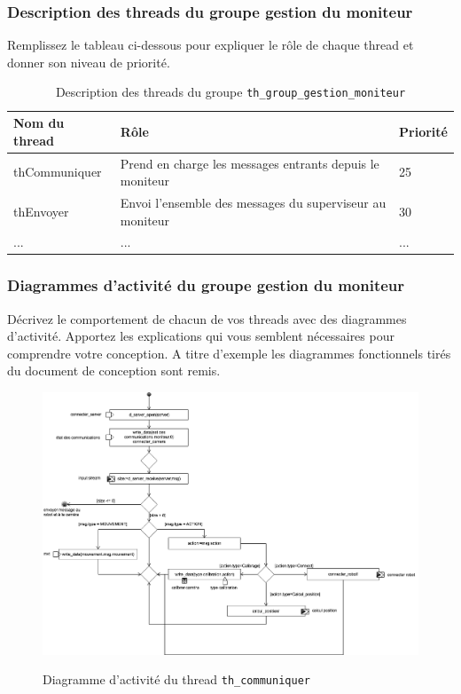 \documentclass[11pt, a4paper]{paper}
\begin{document}
\subsubsection{Description des threads  du groupe gestion du moniteur}
{\color{red} Remplissez le tableau ci-dessous pour expliquer le rôle de chaque thread et donner son niveau de priorité.}


\begin{table}[htp]
\caption{Description des threads du groupe {\tt th\_group\_gestion\_moniteur}}
\begin{center}
\begin{tabular}{|p{3cm}|p{8.5cm}|p{2cm}|}
\hline
\bf Nom du thread &	\bf Rôle &	\bf Priorité \\
\hline
\hline
\color{black}thCommuniquer	& \color{black}Prend en charge les messages entrants depuis le moniteur & \color{black}25\\
\hline
\color{black}thEnvoyer	& \color{black}Envoi l'ensemble des messages du superviseur au moniteur & \color{black}30\\
\hline
\color{black}... &	\color{black}... &	\color{black}...\\
\hline
\end{tabular}
\end{center}
\label{tab:gt_moniteur}
\end{table}%

\subsubsection{Diagrammes d'activité  du groupe gestion du moniteur}
{\color{red}Décrivez le comportement de chacun de vos threads avec des diagrammes d'activité. Apportez les explications qui vous semblent nécessaires pour comprendre votre conception. A titre d'exemple les diagrammes fonctionnels tirés du document de conception sont remis.}

\begin{figure}[htbp]
\label{fig:act_communiquer}
\begin{center}
{\includegraphics[scale=.4]{./figures/communiquer}}
{\caption{Diagramme d'activité du thread {\tt th\_communiquer}}}
\end{center}
\end{figure}
\FloatBarrier
\end{document}
